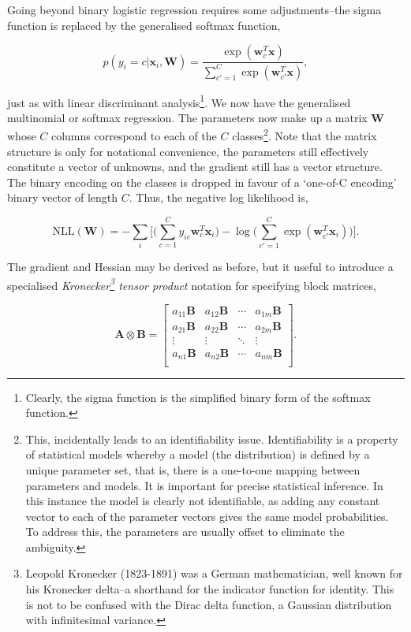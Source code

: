 \documentclass[11pt]{amsart}
\begin{document}
Going beyond binary logistic regression requires some adjustments--the sigma function is replaced by the generalised softmax function,

$$p(y_i = c | \mathbf{x}_i, \mathbf{W}) = \frac{\exp(\mathbf{w}_c^T\mathbf{x})}{\sum_{c' = 1}^C \exp(\mathbf{w}_{c'}^T\mathbf{x})},$$

just as with linear discriminant analysis\footnote{Clearly, the sigma function is the simplified binary form of the softmax function.}. We now have the generalised multinomial or softmax regression. The parameters now make up a matrix $\mathbf{W}$ whose $C$ columns correspond to each of the $C$ classes\footnote{This, incidentally leads to an identifiability issue. Identifiability is a property of statistical models whereby a model (the distribution) is defined by a unique parameter set, that is, there is a one-to-one mapping between parameters and models. It is important for precise statistical inference. In this instance the model is clearly not identifiable, as adding any constant vector to each of the parameter vectors gives the same model probabilities. To address this, the parameters are usually offset to eliminate the ambiguity.}. Note that the matrix structure is only for notational convenience, the parameters still effectively constitute a vector of unknowns, and the gradient still has a vector structure. The binary encoding on the classes is dropped in favour of a `one-of-C encoding' binary vector of length $C$. Thus, the negative log likelihood is,

$$\text{NLL}(\mathbf{W}) = -\sum_i \bigg[\bigg(\sum_{c = 1}^Cy_{ic}\mathbf{w}_c^T\mathbf{x}_i\bigg) - \log\bigg(\sum_{c'=1}^C\exp(\mathbf{w}_{c'}^T\mathbf{x}_i)\bigg)\bigg].$$

The gradient and Hessian may be derived as before, but it useful to introduce a specialised \emph{Kronecker\footnote{Leopold Kronecker (1823-1891) was a German mathematician, well known for his Kronecker delta--a shorthand for the indicator function for identity. This is not to be confused with the Dirac delta function, a Gaussian distribution with infinitesimal variance.} tensor product} notation for specifying block matrices,

$$\mathbf{A} \otimes \mathbf{B} = \begin{bmatrix}
a_{11}\mathbf{B}&a_{12}\mathbf{B}&\cdots&a_{1m}\mathbf{B}\\
a_{21}\mathbf{B}&a_{22}\mathbf{B}&\cdots&a_{2m}\mathbf{B}\\
\vdots & \vdots & \ddots & \vdots \\
a_{n1}\mathbf{B}&a_{n2}\mathbf{B}&\cdots&a_{nm}\mathbf{B}\\
\end{bmatrix}.$$
\end{document}
